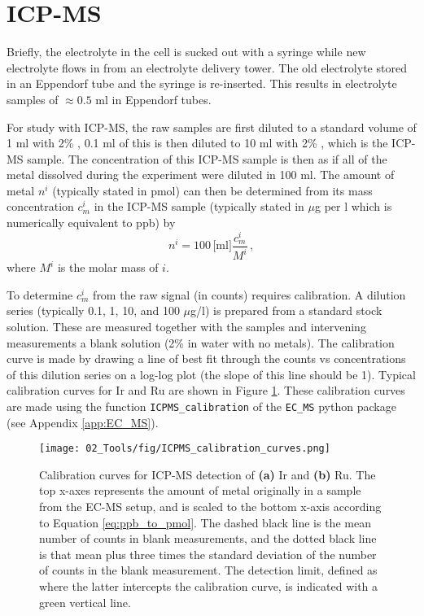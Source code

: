 \section{ICP-MS}\label{app:sampling}


Briefly, the electrolyte in the cell is sucked out with a syringe while new electrolyte flows in from an electrolyte delivery tower. The old electrolyte stored in an Eppendorf tube and the syringe is re-inserted. This results in electrolyte samples of $\approx 0.5$ ml in Eppendorf tubes. 

For study with ICP-MS, the raw samples are first diluted to a standard volume of 1 ml with 2\% , 0.1 ml of this is then diluted to 10 ml with 2\% , which is the ICP-MS sample. The concentration of this ICP-MS sample is then as if all of the metal dissolved during the experiment were diluted in 100 ml. The amount of metal $n^i$ (typically stated in pmol) can then be determined from its mass concentration $c_m^i$ in the ICP-MS sample (typically stated in $\mu$g per l which is numerically equivalent to ppb) by
\begin{equation}
n^i = 100\,\text{[ml]}\frac{c_m^i}{M^i}\,,\label{eq:ppb_to_pmol}
\end{equation}
where $M^i$ is the molar mass of $i$.

To determine $c_m^i$ from the raw signal (in counts) requires calibration. A dilution series (typically 0.1, 1, 10, and 100 $\mu$g/l) is prepared from a standard stock solution. These are measured together with the samples and intervening measurements a blank solution (2\%  in water with no metals). The calibration curve is made by drawing a line of best fit through the counts vs concentrations of this dilution series on a log-log plot (the slope of this line should be 1). Typical calibration curves for Ir and Ru are shown in Figure \ref{fig:ICPMS_cal}. These calibration curves are made using the function \texttt{ICPMS\_calibration} of the \texttt{EC\_MS} python package (see Appendix \ref{app:EC_MS}).

\begin{figure}[h!]
	\centering
	\texttt{[image: 02\_Tools/fig/ICPMS\_calibration\_curves.png]}
	\caption{Calibration curves for ICP-MS detection of \textbf{(a)} Ir and \textbf{(b)} Ru. The top x-axes represents the amount of metal originally in a sample from the EC-MS setup, and is scaled to the bottom x-axis according to Equation \ref{eq:ppb_to_pmol}. The dashed black line is the mean number of counts in blank measurements, and the dotted black line is that mean plus three times the standard deviation of the number of counts in the blank measurement. The detection limit, defined as where the latter intercepts the calibration curve, is indicated with a green vertical line.}
	\label{fig:ICPMS_cal}
\end{figure}

